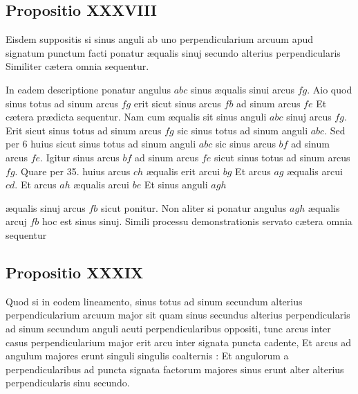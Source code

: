 \documentclass[11pt,a4paper]{article}
\begin{document}
\subsection*{Propositio XXXVIII}

Eisdem suppositis si sinus anguli ab uno perpendicularium arcuum apud signatum punctum facti ponatur æqualis sinuj secundo alterius perpendicularis Similiter cætera omnia sequentur.

In eadem descriptione ponatur angulus $abc$ sinus æqualis sinui arcus $fg$. Aio quod sinus totus ad sinum arcus $fg$ erit sicut sinus arcus $fb$ ad sinum arcus $fe$ Et cætera prædicta sequentur. Nam cum æqualis sit sinus anguli $abc$ sinuj arcus $fg$. Erit sicut sinus totus ad sinum arcus $fg$ sic sinus totus ad sinum anguli $abc$. Sed per 6 huius sicut sinus totus ad sinum anguli $abc$ sic sinus arcus $bf$ ad sinum arcus $fe$. Igitur sinus arcus $bf$ ad sinum arcus $fe$ sicut sinus totus ad sinum arcus $fg$. Quare per 35. huius arcus $ch$ æqualis erit arcui $bg$ Et arcus $ag$ æqualis arcui $cd$. Et arcus $ah$ æqualis arcui $be$ Et sinus anguli $agh$

æqualis sinuj arcus $fb$ sicut ponitur. Non aliter si ponatur angulus $agh$ æqualis arcuj $fb$ hoc est sinus sinuj. Simili processu demonstrationis servato cætera omnia sequentur

\subsection*{Propositio XXXIX}

Quod si in eodem lineamento, sinus totus ad sinum secundum alterius perpendicularium arcuum major sit quam sinus secundus alterius perpendicularis ad sinum secundum anguli acuti perpendicularibus oppositi, tunc arcus inter casus perpendicularium major erit arcu inter signata puncta cadente, Et arcus ad angulum majores erunt singuli singulis coalternis : Et angulorum a perpendicularibus ad puncta signata factorum majores sinus erunt alter alterius perpendicularis sinu secundo.
\end{document}
